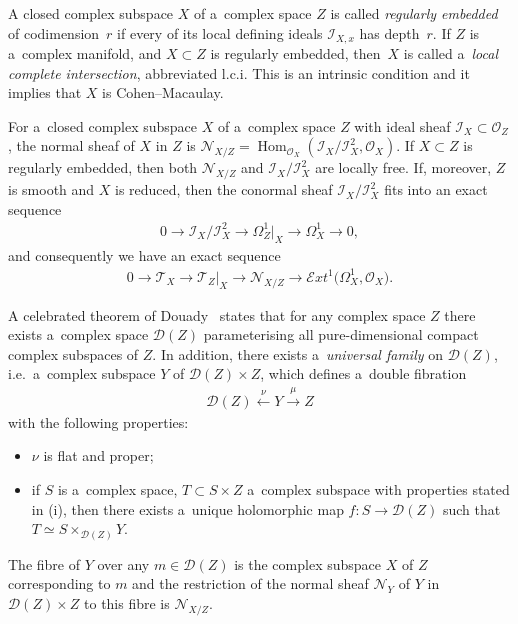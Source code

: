 \documentclass[pdftex]{sigma}
\numberwithin{equation}{section}
\begin{document}
A closed complex subspace $X$ of a~complex space $Z$ is called {\em regularly embedded} of codimension~$r$ if every of
its local def\/ining ideals $ {\mathcal{I}}_{X,x}$ has depth~$r$.
If $Z$ is a~complex manifold, and $X\subset Z$ is regularly embedded, then~$X$ is called a~{\em local complete
intersection}, abbreviated l.c.i.
This is an intrinsic condition and it implies that $X$ is Cohen--Macaulay.

For a~closed complex subspace $X$ of a~complex space $Z$ with ideal sheaf $ {\mathcal{I}}_X\subset {\mathcal{O}}_Z$, the
normal sheaf of $X$ in $Z$ is ${\mathcal{N}}_{X/Z}=\operatorname{Hom}_{{\mathcal{O}}_X}( {\mathcal{I}}_X/
{\mathcal{I}}_X^2,{\mathcal{O}}_X)$.
If $X\subset Z$ is regularly embedded, then both ${\mathcal{N}}_{X/Z}$ and $ {\mathcal{I}}_X/ {\mathcal{I}}_X^2$ are
locally free.
If, moreover, $Z$ is smooth and $X$ is reduced, then the conormal sheaf $ {\mathcal{I}}_X/ {\mathcal{I}}_X^2$ f\/its into
an exact sequence
\begin{gather*}
0\to {\mathcal{I}}_X/ {\mathcal{I}}_X^2\to \Omega^1_Z|_X\to \Omega^1_X\to 0,
\end{gather*}
and consequently we have an exact sequence
\begin{gather*}
0\to {\mathcal{T}}_X\to {\mathcal{T}}_Z|_X\to {\mathcal{N}}_{X/Z}\to \mathcal{E}xt^1\big(\Omega^1_X,{\mathcal{O}}_X\big).
\end{gather*}

A celebrated theorem of Douady~\cite{Dou} states that for any complex space $Z$ there exists a~complex space
${\mathcal{D}}(Z)$ parameterising all pure-dimensional compact complex subspaces of $Z$.
In addition, there exists a~{\em universal family} on ${\mathcal{D}}(Z)$, i.e.\
a~complex subspace $Y$ of ${\mathcal{D}}(Z)\times Z$, which def\/ines a~double f\/ibration
\begin{gather}
{\mathcal{D}}(Z)\stackrel{\nu}{\longleftarrow} Y \stackrel{\mu}{\longrightarrow} Z
\label{seqq0}
\end{gather}
with the following properties:
\begin{itemize}\itemsep=0pt
\item[(i)] $\nu$ is f\/lat and proper; \item[(ii)] if $S$ is a~complex space, $T\subset S\times Z$ a~complex subspace with
properties stated in (i), then there exists a~unique holomorphic map $f:S\to {\mathcal{D}}(Z)$ such that $T\simeq
S\times_{{\mathcal{D}}(Z)} Y$.
\end{itemize}
The f\/ibre of $Y$ over any $m\in {\mathcal{D}}(Z)$ is the complex subspace $X$ of $Z$ corresponding to $m$ and the
restriction of the normal sheaf ${\mathcal{N}}_Y$ of $Y$ in ${\mathcal{D}}(Z)\times Z$ to this f\/ibre is
${\mathcal{N}}_{X/Z}$.
\end{document}
